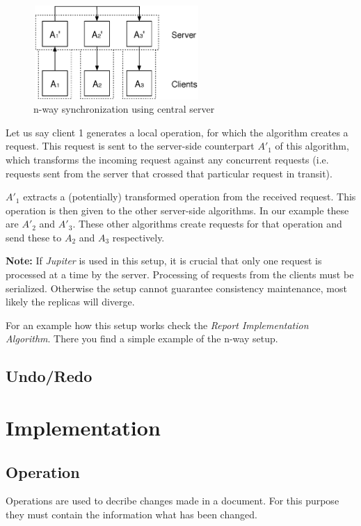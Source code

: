 \begin{figure}[htb]
 \centering
 \includegraphics[width=6.31cm,height=3.56cm]{../images/finalreport/concepts_nway-details.eps}
 \caption{n-way synchronization using central server}
 \label{fig:concepts.nway-details}
\end{figure}

Let us say client 1 generates a local operation, for which the algorithm
creates a request. This request is sent to the server-side counterpart $A'_1$ of
this algorithm, which transforms the incoming request against any concurrent
requests (i.e. requests sent from the server that crossed that particular 
request in transit).

$A'_1$ extracts a (potentially) transformed operation from the received 
request. This operation is then given to the other server-side algorithms. 
In our example these are $A'_2$ and $A'_3$. These other algorithms create
requests for that operation and send these to $A_2$ and $A_3$ respectively.

\textbf{Note:} If \emph{Jupiter} is used in this setup, it is crucial that
only one request is processed at a time by the server. Processing of
requests from the clients must be serialized. Otherwise the setup cannot
guarantee consistency maintenance, most likely the replicas will diverge.

For an example how this setup works check the 
\emph{Report Implementation Algorithm}. There you find a simple example
of the n-way setup.


\subsection{Undo/Redo}
\label{sect:algorithm.undoredo}
% 
%



\section{Implementation}


\subsection{Operation}
Operations are used to decribe changes made in a document. For this purpose they 
must contain the information what has been changed.

